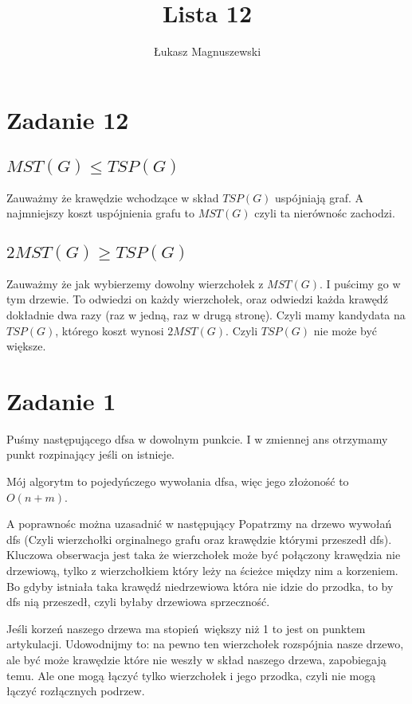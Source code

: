 \documentclass{article}
\title{Lista 12}
\author{Łukasz Magnuszewski}
\date{\vspace{-5ex}}
\begin{document}
\maketitle
\section*{Zadanie 12}

\subsection*{$MST(G) \leq TSP(G)$}
Zauważmy że krawędzie wchodzące w skład $TSP(G)$ uspójniają graf. 
A najmniejszy koszt uspójnienia grafu to $MST(G)$ czyli ta nierównośc zachodzi.

\subsection*{$ 2MST(G) \geq TSP(G)$}
Zauważmy że jak wybierzemy dowolny wierzchołek z $MST(G)$. I puścimy go w tym drzewie. 
To odwiedzi on każdy wierzchołek, oraz odwiedzi każda krawędź dokładnie dwa razy 
(raz w jedną, raz w drugą stronę). Czyli mamy kandydata na $TSP(G)$, 
którego koszt wynosi $2 MST(G)$. Czyli $TSP(G)$ nie może być większe.

\section*{Zadanie 1}
Puśmy następującego dfsa w dowolnym punkcie. I w zmiennej
 ans otrzymamy punkt rozpinający jeśli on istnieje.


Mój algorytm to pojedyńczego wywołania dfsa, więc jego złożoność to $O(n+m)$. 

A poprawnośc można uzasadnić w następujący Popatrzmy na drzewo wywołań dfs 
(Czyli wierzchołki orginalnego grafu oraz krawędzie którymi przeszedł dfs). Kluczowa obserwacja jest taka że wierzchołek może być połączony krawędzia nie drzewiową, tylko z wierzchołkiem który 
leży na ścieżce między nim a korzeniem. Bo gdyby istniała taka krawędź niedrzewiowa która nie idzie do przodka, to by dfs nią przeszedł, czyli byłaby drzewiowa sprzeczność.

Jeśli korzeń naszego drzewa ma stopień większy niż 1 to jest on punktem artykulacji. 
Udowodnijmy to: na pewno ten wierzchołek rozspójnia nasze drzewo, ale być może krawędzie które nie weszły
w skład naszego drzewa, zapobiegają temu. Ale one mogą łączyć tylko wierzchołek i jego przodka, czyli nie mogą łączyć rozłącznych podrzew.
\end{document}
